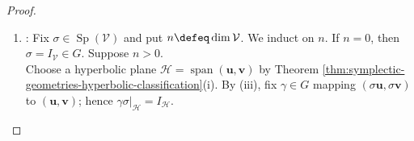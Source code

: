 \begin{theorem}
\begin{proof}
\begin{enumerate}[label=(\roman*)]
Choose $\gamma\in G$ satisfying $\gamma\mathbf{u}=\mathbf{u}'$ by (ii), and put $\mathbf{w}\defeq\gamma\mathbf{v}$. Then $(\mathbf{u}',\mathbf{w})$ is hyperbolic. If $\mathbf{w}=\mathbf{v}'$, put $\delta\defeq I_{\mathcal{V}}$.\\
If $p\defeq\innerprod{\mathbf{w},\mathbf{v}'}\neq0$, put $\delta\defeq\tau_{\mathbf{v}'-\mathbf{w},p^{-1}}$. Then $\delta\mathbf{u}'=\mathbf{u}'$ and $\delta\mathbf{w}=\mathbf{v}'$ by direct evaluation. Suppose $\mathbf{w}\neq\mathbf{v}'$ and $\innerprod{\mathbf{w},\mathbf{v}'}=0$.\\
If $a\mathbf{u}'+b\mathbf{w}+c\mathbf{v}'=\mathbf{0}$, then $b+c=0$ and $a=0$ by pairing with $\mathbf{u}'$ and $\mathbf{w}$.\\
Hence $b(\mathbf{w}-\mathbf{v}')=\mathbf{0}$, so $a=b=c=0$ and $\mathbf{u}',\mathbf{w},\mathbf{v}'$ are independent. Choose $\mathcal{V}=\operatorname{span}(\mathbf{u}',\mathbf{w},\mathbf{v}')\oplus\mathcal{C}$ by Proposition \ref{prop:complements-exist-finite-dimensions}.\\
Define $f\in\mathcal{V}'$ by $f(a\mathbf{u}'+b\mathbf{w}+c\mathbf{v}'+\mathbf{d})=a+b-c$ for $\mathbf{d}\in\mathcal{C}$. Fix $\mathbf{z}$ satisfying $(\forall\,\mathbf{t}\in\mathcal{V})\,f(\mathbf{t})=\innerprod{\mathbf{t},\mathbf{z}}$ by Theorem \ref{thm:riesz-map-for-nonsingular-metric-spaces}.\\
Then $\innerprod{\mathbf{u}',\mathbf{z}}=\innerprod{\mathbf{w},\mathbf{z}}=\innerprod{\mathbf{z},\mathbf{v}'}=1$ by the definition of $f$ and alternation.\\
The transvections $\tau_{\mathbf{z}-\mathbf{w},1}$ and $\tau_{\mathbf{v}'-\mathbf{z},1}$ fix $\mathbf{u}'$. The identities $\tau_{\mathbf{z}-\mathbf{w},1}(\mathbf{w})=\mathbf{z}$ and $\tau_{\mathbf{v}'-\mathbf{z},1}(\mathbf{z})=\mathbf{v}'$ hold by direct evaluation.\\
Thus $\delta\defeq\tau_{\mathbf{v}'-\mathbf{z},1}\tau_{\mathbf{z}-\mathbf{w},1}$ fixes $\mathbf{u}'$ and maps $\mathbf{w}$ to $\mathbf{v}'$. In every case, $\delta\gamma\in G$ maps $(\mathbf{u},\mathbf{v})$ to $(\mathbf{u}',\mathbf{v}')$.
\item {}: Fix $\sigma\in\operatorname{Sp}(\mathcal{V})$ and put $n\defeq\dim\mathcal{V}$. We induct on $n$. If $n=0$, then $\sigma=I_{\mathcal{V}}\in G$. Suppose $n>0$.\\
Choose a hyperbolic plane $\mathcal{H}=\operatorname{span}(\mathbf{u},\mathbf{v})$ by Theorem \ref{thm:symplectic-geometries-hyperbolic-classification}(i). By (iii), fix $\gamma\in G$ mapping $(\sigma\mathbf{u},\sigma\mathbf{v})$ to $(\mathbf{u},\mathbf{v})$; hence $\gamma\sigma|_{\mathcal{H}}=I_{\mathcal{H}}$.\\

\end{enumerate}
\end{proof}
\end{theorem}
